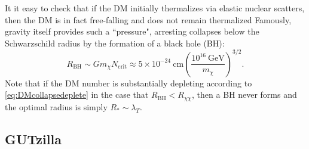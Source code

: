 \documentclass[preprintnumbers,amsmath,amssymb,prd,superscriptaddress]{revtex4}
\newcommand{\GeV}{\text{GeV}}
\newcommand{\cm}{\text{cm}}
\def\r{\right)}
\def\l{\left(}
\begin{document}
It it easy to check that if the DM initially thermalizes via elastic nuclear scatters, then the DM is in fact free-falling and does not remain thermalized
Famously, gravity itself provides such a ``pressure", arresting collapses below the Schwarzschild radius by the formation of a black hole (BH):
\begin{equation}
R_\text{BH} \sim G m_\chi N_\text{crit} \approx 5 \times 10^{-24} ~\cm \l \frac{10^{16} ~\GeV}{m_\chi} \r^{3/2}.
\end{equation}
Note that if the DM number is substantially depleting according to \eqref{eq:DMcollapsedeplete} in the case that $R_\text{BH} < R_{\chi \chi}$, then a BH never forms and the optimal radius is simply $R_* \sim \lambda_T$. 
 
\subsection{GUTzilla}
\end{document}
